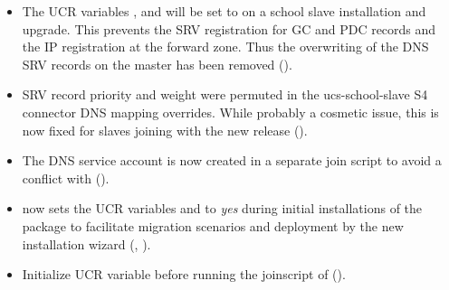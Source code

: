 \begin{itemize}
\item The UCR variables ,
 and
 will be set to  on a
school slave installation and upgrade. This prevents the SRV registration for
GC and PDC records and the IP registration at the forward zone. Thus the
overwriting of the DNS SRV records on the master has been removed
().

\item SRV record priority and weight were permuted in the ucs-school-slave S4 connector DNS mapping overrides.
While probably a cosmetic issue, this is now fixed for slaves joining with the new release ().

\item The DNS service account is now created in a separate join script 
to avoid a conflict with  ().

\item {} now sets the UCR variables  and
   to \emph{yes} during initial installations of the package to facilitate
  migration scenarios and deployment by the new installation wizard (, ).

\item Initialize UCR variable  before running the joinscript of  ().
\end{itemize}

%


%

